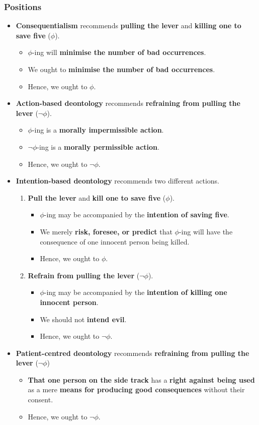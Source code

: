 \documentclass[11pt]{article}
\begin{document}
 \newpage
\subsubsection{Positions}
\label{sec:org9d8c837}
\begin{itemize}
\item \textbf{Consequentialism} recommends \textbf{pulling the lever} and \textbf{killing one to save five} (\(\phi\)).
\begin{itemize}
\item \(\phi\)-ing will \textbf{minimise the number of bad occurrences}.
\item We ought to \textbf{minimise the number of bad occurrences}.
\item Hence, we ought to \(\phi\).
\end{itemize}
\item \textbf{Action-based deontology} recommends \textbf{refraining from pulling the lever} (\(\neg \phi\)).
\begin{itemize}
\item \(\phi\)-ing is a \textbf{morally impermissible action}.
\item \(\neg \phi\)-ing is a \textbf{morally permissible action}.
\item Hence, we ought to \(\neg \phi\).
\end{itemize}
\item \textbf{Intention-based deontology} recommends two different actions.
\begin{enumerate}
\item \textbf{Pull the lever} and \textbf{kill one to save five} (\(\phi\)).
\begin{itemize}
\item \(\phi\)-ing may be accompanied by the \textbf{intention of saving five}.
\item We merely \textbf{risk, foresee, or predict} that \(\phi\)-ing will have the consequence of one innocent person being killed.
\item Hence, we ought to \(\phi\).
\end{itemize}
\item \textbf{Refrain from pulling the lever} (\(\neg \phi\)).
\begin{itemize}
\item \(\phi\)-ing may be accompanied by the \textbf{intention of killing one innocent person}.
\item We should not \textbf{intend evil}.
\item Hence, we ought to \(\neg \phi\).
\end{itemize}
\end{enumerate}
\item \textbf{Patient-centred deontology} recommends \textbf{refraining from pulling the lever} (\(\neg \phi\))
\begin{itemize}
\item \textbf{That one person on the side track} has a \textbf{right against being used} as a mere \textbf{means for producing good consequences} without their consent.
\item Hence, we ought to \(\neg \phi\).
\end{itemize}
\end{itemize}
\end{document}

